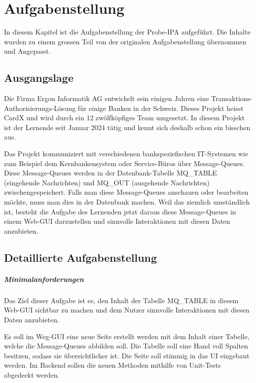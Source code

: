 \chapter{Aufgabenstellung}\label{ch:aufgabenstellung}
In diesem Kapitel ist die Aufgabenstellung der Probe-IPA aufgeführt. Die Inhalte wurden zu einem grossen Teil von der originalen Aufgabenstellung übernommen und Angepasst.

\section{Ausgangslage}\label{sec:ausgangslage}
Die Firma \gls{Ergon Informatik AG} entwickelt sein einigen Jahren eine Transaktions-Authorisierungs-Lösung für einige Banken in der Schweiz. Dieses Projekt heisst \gls{CardX} und wird durch ein 12 zwölfköpfiges Team umgesetzt. In diesem Projekt ist der Lernende seit Januar 2024 tätig und kennt sich deshalb schon ein bisschen aus.

Das Projekt kommuniziert mit verschiedenen bankspeziefischen IT-Systemen wie zum Beispiel dem Kernbankensystem oder Service-Büros über Message-Queues. Diese Message-Queues werden in der Datenbank-Tabelle MQ\_TABLE (eingehende Nachrichten) und MQ\_OUT (ausgehende Nachrichten) zwischengespeichert. Falls man diese Message-Queues anschauen oder bearbeiten möchte, muss man dies in der Datenbank machen. Weil das ziemlich umständlich ist, besteht die Aufgabe des Lernenden jetzt daraus diese Message-Queues in einem \gls{Web-GUI} darzustellen und sinnvolle Interaktionen mit diesen Daten anzubieten.

\section{Detaillierte Aufgabenstellung}\label{sec:detaillierte-aufgabenstellung}

\paragraph{Minimalanforderungen}
Das Ziel dieser Aufgabe ist es, den Inhalt der Tabelle MQ\_TABLE in diesem Web-GUI sichtbar zu machen und dem Nutzer sinnvolle Interaktionen mit diesen Daten anzubieten.

Es soll im Weg-GUI eine neue Seite erstellt werden mit dem Inhalt einer Tabelle, welche die Message-Queues abbilden soll. Die Tabelle soll eine Hand voll Spalten besitzen, sodass sie übersichtlicher ist. Die Seite soll stimmig in das \gls{UI} eingebaut werden. Im \gls{Backend} sollen die neuen Methoden mithilfe von Unit-Tests abgedeckt werden.

